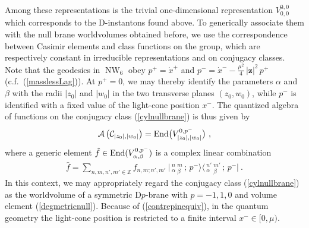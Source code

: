 \documentclass[11pt,a4paper]{article}
\DeclareMathOperator{\NW}{NW}
\newcommand{\mbf}[1]{{\boldsymbol {#1} }}
\def\mz{{\mbf z}}
\newcommand{\zed}{{\mathbb Z}} %
\newcommand{\beq}{\begin{eqnarray}}
\newcommand{\eeq}{\end{eqnarray}}
\begin{document}
Among these representations is the trivial one-dimensional
representation $V_{0,0}^{0,0}$ which corresponds to the D-instantons
found above. To generically associate them with the null brane worldvolumes
obtained before, we use the correspondence between Casimir elements
and class functions on the group, which are respectively constant in
irreducible representations and on conjugacy classes. Note that the
geodesics in $\NW_6$ obey $p^+=\dot x^+$ and $p^-=\dot
x^--\frac{\mu^2}4\,|\mz|^2\,p^+$
(c.f.~(\ref{masslessLag})). At $p^+=0$, we may thereby identify the
parameters $\alpha$ and $\beta$ with the radii $|z_0|$ and $|w_0|$ in
the two transverse planes $(z_0,w_0)$, while $p^-$ is identified with
a fixed value of the light-cone position $x^-$. The quantized
algebra of functions on the conjugacy class (\ref{cylnullbrane}) is
thus given by
\beq
\mathcal{A}\left(\mathcal{C}_{|z_0|,|w_0|}\right)=
{\rm End}\bigl(V_{|z_0|,|w_0|}^{0,p^-}\bigr) \ ,
\label{quantalgnullbrane}\eeq
where a generic element $\hat f\in{\rm End}(V_{\alpha,\beta}^{0,p^-})$
is a complex linear combination
\beq
\hat
f=\sum_{n,m,n',m'\in\zed}f_{n,m;n',m'}~\bigl|\,{}^n_\alpha\,{}^m_\beta
\,;\,p^-\bigr\rangle\bigl\langle\,{}^{n'}_\alpha\,{}^{m'}_\beta
\,;\,p^-\bigr| \ .
\label{contreplincomb}\eeq
In this context, we may appropriately regard the conjugacy
class (\ref{cylnullbrane}) as the worldvolume of a symmetric
D$p$-brane with $p=-1,1,0$ and volume element
(\ref{degmetricnull}). Because of (\ref{contrepinequiv}), in the
quantum geometry the light-cone position is restricted to a finite
interval $x^-\in[0,\mu)$.
\end{document}
